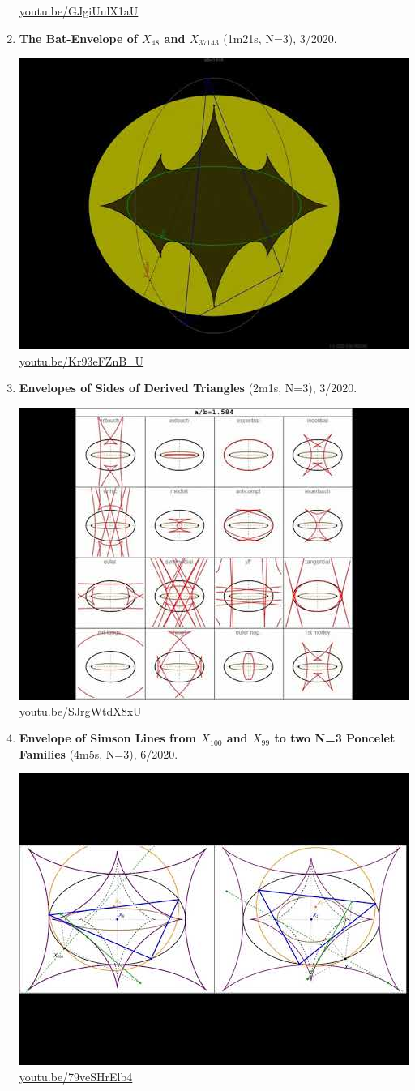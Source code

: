 \documentclass[12pt]{amsart}
\begin{document}
\begin{enumerate}[resume]
\begin{center}
\href{https://youtu.be/GJgiUulX1aU}{\url{youtu.be/GJgiUulX1aU}}\end{center}
% 
\item \textbf{The Bat-Envelope of $X_{48}$ and $X_{37143}$} (1m21s, N=3), 3/2020. 
\begin{center}\includegraphics[width=.5\textwidth]{pics/Kr93eFZnB_U.jpg} \\ 
\href{https://youtu.be/Kr93eFZnB_U}{\url{youtu.be/Kr93eFZnB\_U}}\end{center}
% 
\item \textbf{Envelopes of Sides of Derived Triangles} (2m1s, N=3), 3/2020. 
\begin{center}\includegraphics[width=.5\textwidth]{pics/SJrgWtdX8xU.jpg} \\ 
\href{https://youtu.be/SJrgWtdX8xU}{\url{youtu.be/SJrgWtdX8xU}}\end{center}
% 
\item \textbf{Envelope of Simson Lines from $X_{100}$ and $X_{99}$ to two N=3 Poncelet Families} (4m5s, N=3), 6/2020. 
\begin{center}\includegraphics[width=.5\textwidth]{pics/79veSHrElb4.jpg} \\ 
\href{https://youtu.be/79veSHrElb4}{\url{youtu.be/79veSHrElb4}}\end{center}
% 
\end{enumerate}
\end{document}
